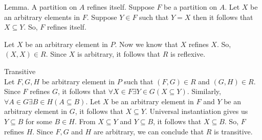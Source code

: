 \documentclass{article}
\begin{document}
Lemma. A partition on $A$ refines itself.
Suppose $F$ be a partition on $A$. Let $X$ be an arbitrary elements in
$F$. Suppose $Y \in F$ such that $Y = X$ then it follows that $X
\subseteq Y$. So, $F$ refines itself.

Let $X$ be an arbitrary element in $P$. Now we know that $X$ refines
$X$. So, $(X,X) \in R$. Since $X$ is arbitrary, it follows that $R$ is
reflexive.

Transitive \\
Let $F,G,H$ be arbitrary element in $P$ such that $(F,G) \in R$ and
$(G,H) \in R$. Since $F$ refines $G$, it follows that $\forall X \in F
\exists Y \in G(X \subseteq Y)$. Similarly, $\forall A \in G \exists B
\in H(A \subseteq B)$. Let $X$ be an arbitrary element in $F$ and $Y$
be an arbitrary element in $G$, it follows that $X \subseteq Y$.
Universal instantiation gives us $Y \subseteq B$ for some $B \in H$.
From $X \subseteq Y$ and $Y \subseteq B$, it follows that $X \subseteq
B$. So, $F$ refines $H$. Since $F,G$ and $H$ are arbitrary, we can
conclude that $R$ is transitive.
\end{document}

